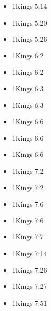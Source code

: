\documentclass[14pt]{book}
\begin{document}
\begin{multicols}{2}
\begin{itemize}
									\item 1Kings 5:14
									
									\item 1Kings 5:20
									
									\item 1Kings 5:26
									
									\item 1Kings 6:2
									
									\item 1Kings 6:2
									
									\item 1Kings 6:3
									
									\item 1Kings 6:3
									
									\item 1Kings 6:6
									
									\item 1Kings 6:6
									
									\item 1Kings 6:6
									
									\item 1Kings 7:2
									
									\item 1Kings 7:2
									
									\item 1Kings 7:6
									
									\item 1Kings 7:6
									
									\item 1Kings 7:7
									
									\item 1Kings 7:14
									
									\item 1Kings 7:26
									
									\item 1Kings 7:27
									
									\item 1Kings 7:51
									

\end{itemize}
\end{multicols}
\end{document}
